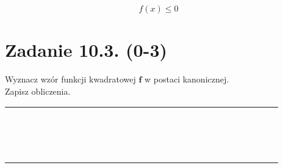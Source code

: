 \documentclass[10pt]{article}
\begin{document}
\[
f(x) \leq 0
\]

\section*{Zadanie 10.3. (0-3)}
Wyznacz wzór funkcji kwadratowej \(\boldsymbol{f}\) w postaci kanonicznej.\\
Zapisz obliczenia.

\begin{center}
\begin{tabular}{|c|c|c|c|c|c|c|c|c|c|c|c|c|c|c|c|c|c|c|c|c|c|c|c|c|c|c|c|}
\hline
 &  &  &  &  &  &  &  &  &  &  &  &  &  &  &  &  &  &  &  &  &  &  &  &  &  &  &  \\
\hline
 &  &  &  &  &  &  &  &  &  &  &  &  &  &  &  &  &  &  &  &  &  &  &  &  &  &  &  \\
\hline
 &  &  &  &  &  &  &  &  &  &  &  &  &  &  &  &  &  &  &  &  &  &  &  &  &  &  &  \\
\hline
 &  &  &  &  &  &  &  &  &  &  &  &  &  &  &  &  &  &  &  &  &  &  &  &  &  &  &  \\
\hline
 &  &  &  &  &  &  &  &  &  &  &  &  &  &  &  &  &  &  &  &  &  &  &  &  &  &  &  \\
\hline
 &  &  &  &  &  &  &  &  &  &  &  &  &  &  &  &  &  &  &  &  &  &  &  &  &  &  &  \\
\hline
 &  &  &  &  &  &  &  &  &  &  &  &  &  &  &  &  &  &  &  &  &  &  &  &  &  &  &  \\
\hline
 &  &  &  &  &  &  &  &  &  &  &  &  &  &  &  &  &  &  &  &  &  &  &  &  &  &  &  \\
\hline
 &  &  &  &  &  &  &  &  &  &  &  &  &  &  &  &  &  &  &  &  &  &  &  &  &  &  &  \\
\hline
 &  &  &  &  &  &  &  &  &  &  &  &  &  &  &  &  &  &  &  &  &  &  &  &  &  &  &  \\
\hline
 &  &  &  &  &  &  &  &  &  &  &  &  &  &  &  &  &  &  &  &  &  &  &  &  &  &  &  \\
\hline
 &  &  &  &  &  &  &  &  &  &  &  &  &  &  &  &  &  &  &  &  &  &  &  &  &  &  &  \\
\hline
 &  &  &  &  &  &  &  &  &  &  &  &  &  &  &  &  &  &  &  &  &  &  &  &  &  &  &  \\
\hline
 &  &  &  &  &  &  &  &  &  &  &  &  &  &  &  &  &  &  &  &  &  &  &  &  &  &  &  \\
\hline
 &  &  &  &  &  &  &  &  &  &  &  &  &  &  &  &  &  &  &  &  &  &  &  &  &  &  &  \\
\hline
 &  &  &  &  &  &  &  &  &  &  &  &  &  &  &  &  &  &  &  &  &  &  &  &  &  &  &  \\

\end{tabular}
\end{center}
\end{document}
